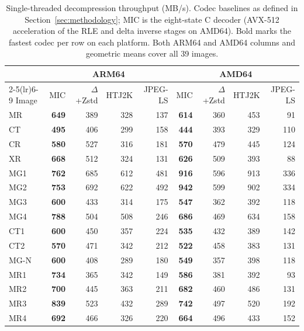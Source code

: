 \documentclass[journal]{IEEEtran}
\begin{document}
\begin{table}[htbp]
\centering
\caption{Single-threaded decompression throughput (MB/s).
Codec baselines as defined in Section~\ref{sec:methodology}; MIC is
the eight-state C decoder (AVX-512 acceleration of the RLE and delta
inverse stages on AMD64). Bold marks the fastest codec per row on
each platform. Both ARM64 and AMD64 columns and geometric means cover all 39
images.}
\label{tab:decomp}
\scriptsize
\begin{tabular}{l|rrrr|rrrr}
\toprule
 & \multicolumn{4}{c|}{ARM64} & \multicolumn{4}{c}{AMD64} \\
\cmidrule(lr){2-5}\cmidrule(lr){6-9}
Image & MIC & $\Delta$+Zstd & HTJ2K & JPEG-LS & MIC & $\Delta$+Zstd & HTJ2K & JPEG-LS \\
\midrule
MR             & \textbf{649} & 389 & 328 & 137 & \textbf{614} & 360 & 453 & 91 \\
CT             & \textbf{495} & 406 & 299 & 158 & \textbf{444} & 393 & 329 & 110 \\
CR             & \textbf{580} & 527 & 316 & 181 & \textbf{570} & 479 & 445 & 124 \\
XR             & \textbf{668} & 512 & 324 & 131 & \textbf{626} & 509 & 393 & 88 \\
MG1            & \textbf{762} & 685 & 612 & 481 & \textbf{916} & 596 & 913 & 336 \\
MG2            & \textbf{753} & 692 & 622 & 492 & \textbf{942} & 599 & 902 & 334 \\
MG3            & \textbf{600} & 433 & 314 & 175 & \textbf{547} & 362 & 392 & 118 \\
MG4            & \textbf{788} & 504 & 508 & 246 & \textbf{686} & 469 & 634 & 158 \\
CT1            & \textbf{600} & 450 & 357 & 224 & \textbf{535} & 432 & 389 & 142 \\
CT2            & \textbf{570} & 471 & 342 & 212 & \textbf{522} & 458 & 383 & 131 \\
MG-N           & \textbf{600} & 408 & 289 & 180 & \textbf{549} & 357 & 398 & 118 \\
MR1            & \textbf{734} & 365 & 342 & 149 & \textbf{586} & 381 & 392 & 93 \\
MR2            & \textbf{700} & 445 & 363 & 211 & \textbf{682} & 460 & 486 & 131 \\
MR3            & \textbf{839} & 523 & 432 & 289 & \textbf{742} & 497 & 520 & 192 \\
MR4            & \textbf{692} & 466 & 326 & 220 & \textbf{664} & 496 & 433 & 152 \\

\end{tabular}
\end{table}
\end{document}
